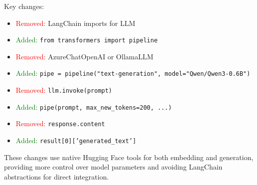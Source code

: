 \documentclass[11pt, a4paper]{article}
\begin{document}
Key changes:
\begin{itemize}
    \item \textcolor{red}{Removed:} LangChain imports for LLM
    \item \textcolor{green}{Added:} \texttt{from transformers import pipeline}
    \item \textcolor{red}{Removed:} AzureChatOpenAI or OllamaLLM
    \item \textcolor{green}{Added:} \texttt{pipe = pipeline("text-generation", model="Qwen/Qwen3-0.6B")}
    \item \textcolor{red}{Removed:} \texttt{llm.invoke(prompt)}
    \item \textcolor{green}{Added:} \texttt{pipe(prompt, max\_new\_tokens=200, ...)}
    \item \textcolor{red}{Removed:} \texttt{response.content}
    \item \textcolor{green}{Added:} \texttt{result[0]['generated\_text']}
\end{itemize}

These changes use native Hugging Face tools for both embedding and generation, providing more control over model parameters and avoiding LangChain abstractions for direct integration.
\end{document}
